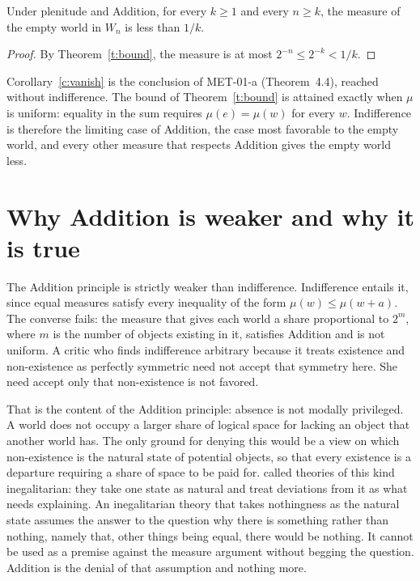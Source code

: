 \documentclass{situationist-preprint}
\begin{document}
\begin{corollary}\label{c:vanish}
Under plenitude and Addition, for every $k \geq 1$ and every $n \geq k$, the measure of the empty world in $W_n$ is less than $1/k$.
\end{corollary}

\begin{proof}
By Theorem~\ref{t:bound}, the measure is at most $2^{-n} \leq 2^{-k} < 1/k$.
\end{proof}

Corollary~\ref{c:vanish} is the conclusion of MET-01-a (Theorem~4.4), reached without indifference. The bound of Theorem~\ref{t:bound} is attained exactly when $\mu$ is uniform: equality in the sum requires $\mu(e) = \mu(w)$ for every $w$. Indifference is therefore the limiting case of Addition, the case most favorable to the empty world, and every other measure that respects Addition gives the empty world less.

\section{Why Addition is weaker and why it is true}

The Addition principle is strictly weaker than indifference. Indifference entails it, since equal measures satisfy every inequality of the form $\mu(w) \leq \mu(w + a)$. The converse fails: the measure that gives each world a share proportional to $2^{m}$, where $m$ is the number of objects existing in it, satisfies Addition and is not uniform. A critic who finds indifference arbitrary because it treats existence and non-existence as perfectly symmetric need not accept that symmetry here. She need accept only that non-existence is not favored.

That is the content of the Addition principle: absence is not modally privileged. A world does not occupy a larger share of logical space for lacking an object that another world has. The only ground for denying this would be a view on which non-existence is the natural state of potential objects, so that every existence is a departure requiring a share of space to be paid for. \citet[ch.~2]{Nozick1981} called theories of this kind inegalitarian: they take one state as natural and treat deviations from it as what needs explaining. An inegalitarian theory that takes nothingness as the natural state assumes the answer to the question why there is something rather than nothing, namely that, other things being equal, there would be nothing. It cannot be used as a premise against the measure argument without begging the question. Addition is the denial of that assumption and nothing more.
\end{document}
